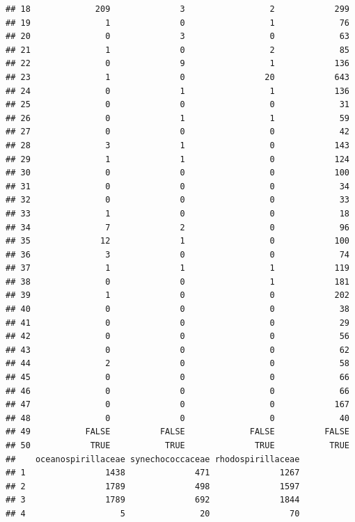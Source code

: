 \documentclass[12pt]{beamer}\usepackage[]{graphicx}\usepackage[]{color}
\makeatletter
\newenvironment{kframe}{%
 \def\at@end@of@kframe{}%
 \ifinner\ifhmode%
  \def\at@end@of@kframe{\end{minipage}}%
  \begin{minipage}{\columnwidth}%
 \fi\fi%
 \def\FrameCommand##1{\hskip\@totalleftmargin \hskip-\fboxsep
 \colorbox{shadecolor}{##1}\hskip-\fboxsep
     \hskip-\linewidth \hskip-\@totalleftmargin \hskip\columnwidth}%
 \MakeFramed {\advance\hsize-\width
   \@totalleftmargin\z@ \linewidth\hsize
   \@setminipage}}%
 {\par\unskip\endMakeFramed%
 \at@end@of@kframe}
\newenvironment{knitrout}{}{} %
\makeatother
\begin{document}
\begin{frame}[fragile]
\begin{knitrout}
\begin{kframe}
\begin{verbatim}
## 18             209              3                 2            299
## 19               1              0                 1             76
## 20               0              3                 0             63
## 21               1              0                 2             85
## 22               0              9                 1            136
## 23               1              0                20            643
## 24               0              1                 1            136
## 25               0              0                 0             31
## 26               0              1                 1             59
## 27               0              0                 0             42
## 28               3              1                 0            143
## 29               1              1                 0            124
## 30               0              0                 0            100
## 31               0              0                 0             34
## 32               0              0                 0             33
## 33               1              0                 0             18
## 34               7              2                 0             96
## 35              12              1                 0            100
## 36               3              0                 0             74
## 37               1              1                 1            119
## 38               0              0                 1            181
## 39               1              0                 0            202
## 40               0              0                 0             38
## 41               0              0                 0             29
## 42               0              0                 0             56
## 43               0              0                 0             62
## 44               2              0                 0             58
## 45               0              0                 0             66
## 46               0              0                 0             66
## 47               0              0                 0            167
## 48               0              0                 0             40
## 49           FALSE          FALSE             FALSE          FALSE
## 50            TRUE           TRUE              TRUE           TRUE
##    oceanospirillaceae synechococcaceae rhodospirillaceae
## 1                1438              471              1267
## 2                1789              498              1597
## 3                1789              692              1844
## 4                   5               20                70

\end{verbatim}
\end{kframe}
\end{knitrout}
\end{frame}
\end{document}

